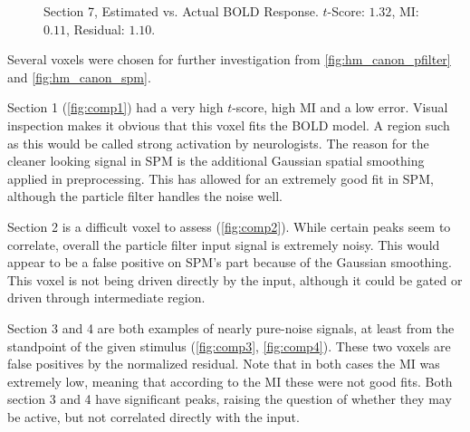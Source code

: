 \begin{figure}
\centering
{}
\caption[Time Series Comparison, Section 7]{Section 7, Estimated vs. Actual \ac{BOLD} Response. $t$-Score: $1.32$, \ac{MI}: $0.11$, Residual: $1.10$.}
\label{fig:comp7}
\end{figure}

Several voxels were chosen for further investigation from \autoref{fig:hm_canon_pfilter} and \autoref{fig:hm_canon_spm}.

Section 1 (\autoref{fig:comp1}) had a very high $t$-score, high \ac{MI} and
a low error. Visual inspection makes it obvious that this voxel fits the \ac{BOLD} model. A region
such as this would be called strong activation by neurologists. The
reason for the cleaner looking signal in \ac{SPM} is the additional Gaussian spatial smoothing
applied in preprocessing. This
has allowed for an extremely good fit in \ac{SPM}, although the particle filter handles the noise
well.

Section 2 is a difficult voxel to assess (\autoref{fig:comp2}).
While certain peaks seem to correlate, overall
the particle filter input signal is extremely noisy.
This would appear to be a false positive on \ac{SPM}'s part because of the Gaussian smoothing.
This voxel is not being driven directly by the input, although it
could be gated or driven through intermediate region.

Section 3 and 4 are both examples of nearly pure-noise signals, at least from the standpoint
of the given stimulus (\autoref{fig:comp3}, \autoref{fig:comp4}).
These two voxels are false positives by the normalized residual.
Note that in both cases the \ac{MI} was extremely low, meaning that
according to the \ac{MI} these were not good fits. Both section 3 and 4 have
significant peaks, raising the question of whether they may be active,
but not correlated directly with the input.

